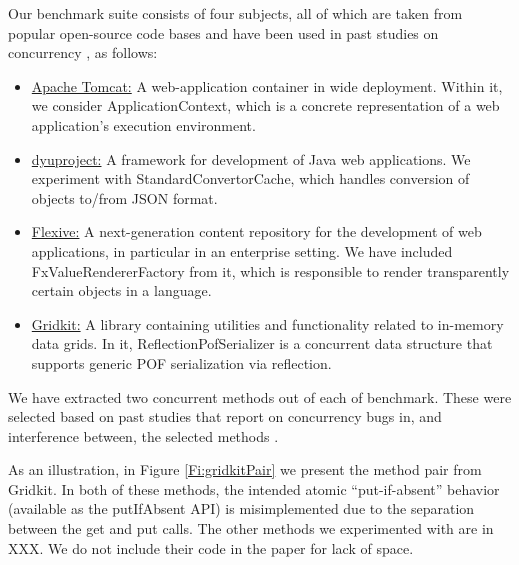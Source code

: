 Our benchmark suite consists of four subjects, all of which are taken from popular open-source code bases and have been used in past studies on concurrency \cite{OhadShacham,...}, as follows:
\begin{itemize}
	\item \underline{Apache Tomcat:} A web-application container in wide deployment. Within it, we consider {\sf ApplicationContext}, which is a concrete representation of a web application's execution environment.
	\item \underline{dyuproject:} A framework for development of Java web applications. We experiment with {\sf StandardConvertorCache}, which handles conversion of objects to/from JSON format.
	\item \underline{Flexive:} A next-generation content repository for the development of web applications, in particular in an enterprise setting. We have included {\sf FxValueRendererFactory} from it, which is responsible to render transparently certain objects in a language.
	\item \underline{Gridkit:} A library containing utilities and functionality related to in-memory data grids. In it, {\sf ReflectionPofSerializer} is a concurrent data structure that supports generic POF serialization via reflection.
\end{itemize}

We have extracted two concurrent methods out of each of benchmark. These were selected based on past studies that report on concurrency bugs in, and interference between, the selected methods \cite{OhadShacham}. 

As an illustration, in Figure \ref{Fi:gridkitPair} we present the method pair from Gridkit. In both of these methods, the intended atomic ``put-if-absent'' behavior (available as the {\sf putIfAbsent} API) is misimplemented due to the separation between the {\sf get} and {\sf put} calls. The other methods we experimented with are in XXX. We do not include their code in the paper for lack of space.

